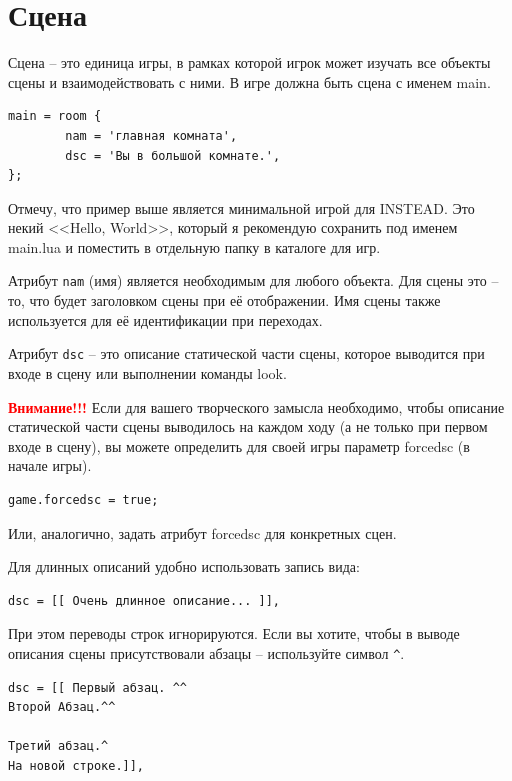 \documentclass[a4paper,12pt]{article}
\begin{document}
\section{Сцена}

Сцена -- это единица игры, в рамках которой игрок может изучать все объекты сцены и взаимодействовать с ними. В игре должна быть сцена с именем main.

\begin{verbatim}
main = room {
        nam = 'главная комната',
        dsc = 'Вы в большой комнате.',
};
\end{verbatim}

Отмечу, что пример выше является минимальной игрой для INSTEAD. Это некий <<Hello, World>>, который я рекомендую сохранить под именем main.lua и поместить в отдельную папку в каталоге для игр.


Атрибут \verb/nam/ (имя) является необходимым для любого объекта. Для сцены это -- то, что будет заголовком сцены при её отображении. Имя сцены также используется для её идентификации при переходах.

Атрибут \verb/dsc/ -- это описание статической части сцены, которое выводится при входе в сцену или выполнении команды look.

\textbf{\textcolor{red}{Внимание!!!}} Если для вашего творческого замысла необходимо, чтобы описание статической части сцены выводилось на каждом ходу (а не только при первом входе в сцену), вы можете определить для своей игры параметр forcedsc (в начале игры).

\begin{verbatim}
game.forcedsc = true;
\end{verbatim}

Или, аналогично, задать атрибут forcedsc для конкретных сцен.

\index{[[ ]]}
Для длинных описаний удобно использовать запись вида:

\begin{verbatim}
dsc = [[ Очень длинное описание... ]],
\end{verbatim}

При этом переводы строк игнорируются. Если вы хотите, чтобы в выводе описания сцены присутствовали абзацы -- используйте символ \verb/^/.

\begin{verbatim}
dsc = [[ Первый абзац. ^^
Второй Абзац.^^

Третий абзац.^
На новой строке.]],
\end{verbatim}
\end{document}
